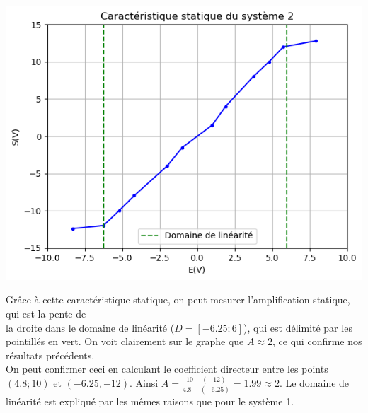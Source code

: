 \documentclass[12pt]{article}
\begin{document}
\begin{center}
    \includegraphics{TP1/Syst_2/Carac_stat_2.png}
\end{center}
Grâce à cette caractéristique statique, on peut mesurer l'amplification statique, qui est la pente de \\la droite dans le domaine de linéarité ($D = \left[-6.25;6\right]$), qui est délimité par les pointillés en vert. On voit clairement sur le graphe que $A\approx2$, ce qui confirme nos résultats précédents.
\\On peut confirmer ceci en calculant le coefficient directeur entre les points $(4.8;10)$ et  $(-6.25,-12)$. Ainsi $A = \frac{10-(-12)}{4.8-(-6.25)} = 1.99 \approx 2$. Le domaine de linéarité est expliqué par les mêmes raisons que pour le système 1.
\newpage
\end{document}
